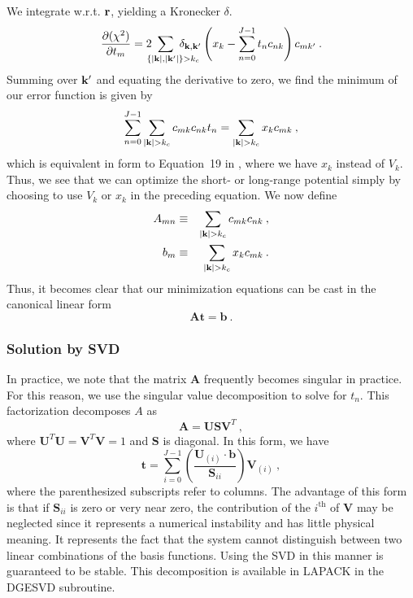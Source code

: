 We integrate w.r.t. $\mathbf{r}$, yielding a Kronecker $\delta$.
\begin{equation}
\frac{\partial (\chi^2)}{\partial t_{m}} =
2 \ns\ns\ns\ns\ns\ns\ns 
\sum_{\ \ \ \ \{|\vk|,|\vk'|\}>k_c} \ns\ns\ns\ns\ns\ns\ns \delta_{\vk, \vk'} 
\left(x_k -\sum_{n=0}^{J-1} t_n c_{nk} \right) c_{mk'}\:.
\end{equation}
Summing over $\mathbf{k}'$ and equating the derivative to zero, we find the
minimum of our error function is given by
\begin{equation}
\sum_{n=0}^{J-1} \sum_{|\vk|>k_c} c_{mk}c_{nk} t_n = 
\sum_{|\vk|>k_c} x_k c_{mk}\:,
\end{equation}
which is equivalent in form to Equation~19 in \cite{Natoli1995}, where
we have $x_k$ instead of $V_k$.  Thus, we see that we can optimize
the short- or long-range potential simply by choosing to use
$V_k$ or $x_k$ in the preceding equation.  We now define
\begin{eqnarray}
A_{mn} & \equiv & \sum_{|\vk|>k_c} c_{mk} c_{nk}\:, \\
b_{m} & \equiv & \sum_{|\vk|>k_c} x_k c_{mk}\:.
\end{eqnarray}
Thus, it becomes clear that our minimization equations can be cast in
the canonical linear form
\newcommand{\bA}{\mathbf{A}}
\newcommand{\bU}{\mathbf{U}}
\newcommand{\bV}{\mathbf{V}}
\newcommand{\bb}{\mathbf{b}}
\newcommand{\bS}{\mathbf{S}}
\begin{equation}
\bA\mathbf{t} = \mathbf{b}\:.
\end{equation}

\subsubsection{Solution by SVD}
In practice, we note that the matrix $\bA$ frequently becomes singular
in practice.  For this reason, we use the singular value decomposition
to solve for $t_n$.  This factorization decomposes $A$ as
\begin{equation}
\bA = \bU \bS \bV^T\:,
\end{equation}
where $\bU^T\bU = \bV^T\bV = 1$ and $\bS$ is diagonal.  In this form, we have
\begin{equation}
\mathbf{t} = \sum_{i=0}^{J-1} \left( \frac{\bU_{(i)} \cdot
  \bb}{\bS_{ii}} \right) \bV_{(i)}\:,
\end{equation}
where the parenthesized subscripts refer to columns.  The advantage of
this form is that if $\bS_{ii}$ is zero or very near zero, the
contribution of the $i^{\text{th}}$ of $\bV$ may be neglected since
it represents a numerical instability and has little physical
meaning.  It represents the fact that the system cannot distinguish
between two linear combinations of the basis functions.  Using the SVD
in this manner is guaranteed to be stable.  This decomposition is
available in LAPACK in the DGESVD subroutine.


